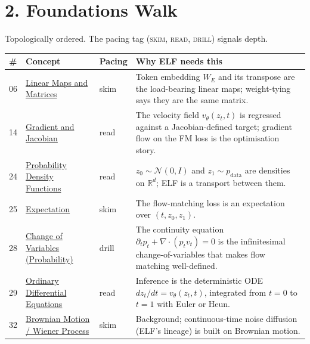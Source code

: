 \documentclass[11pt]{article}
\begin{document}
\section*{2. Foundations Walk}

Topologically ordered. The pacing tag (\textsc{skim}, \textsc{read}, \textsc{drill}) signals depth.

\begin{longtable}{p{}p{}p{}p{}}
\toprule
\textbf{\#} & \textbf{Concept} & \textbf{Pacing} & \textbf{Why ELF needs this} \\
\midrule
\endhead
06 & \href{https://github.com/pleyva2004/math-foundations/blob/main/concepts/06-linear-maps/README.md}{Linear Maps and Matrices} & skim & Token embedding $W_E$ and its transpose are the load-bearing linear maps; weight-tying says they are the same matrix. \\
14 & \href{https://github.com/pleyva2004/math-foundations/blob/main/concepts/14-gradient-jacobian/README.md}{Gradient and Jacobian} & read & The velocity field $v_\theta(z_t, t)$ is regressed against a Jacobian-defined target; gradient flow on the FM loss is the optimisation story. \\
24 & \href{https://github.com/pleyva2004/math-foundations/blob/main/concepts/24-pdf/README.md}{Probability Density Functions} & read & $z_0 \sim \mathcal{N}(0,I)$ and $z_1 \sim p_{\text{data}}$ are densities on $\mathbb{R}^d$; ELF is a transport between them. \\
25 & \href{https://github.com/pleyva2004/math-foundations/blob/main/concepts/25-expectation/README.md}{Expectation} & skim & The flow-matching loss is an expectation over $(t, z_0, z_1)$. \\
28 & \href{https://github.com/pleyva2004/math-foundations/blob/main/concepts/28-change-of-variables-probability/README.md}{Change of Variables (Probability)} & drill & The continuity equation $\partial_t p_t + \nabla \cdot (p_t v_t) = 0$ is the infinitesimal change-of-variables that makes flow matching well-defined. \\
29 & \href{https://github.com/pleyva2004/math-foundations/blob/main/concepts/29-ode/README.md}{Ordinary Differential Equations} & read & Inference is the deterministic ODE $dz_t/dt = v_\theta(z_t, t)$, integrated from $t=0$ to $t=1$ with Euler or Heun. \\
32 & \href{https://github.com/pleyva2004/math-foundations/blob/main/concepts/32-brownian-motion/README.md}{Brownian Motion / Wiener Process} & skim & Background; continuous-time noise diffusion (ELF's lineage) is built on Brownian motion. \\

\end{longtable}
\end{document}
